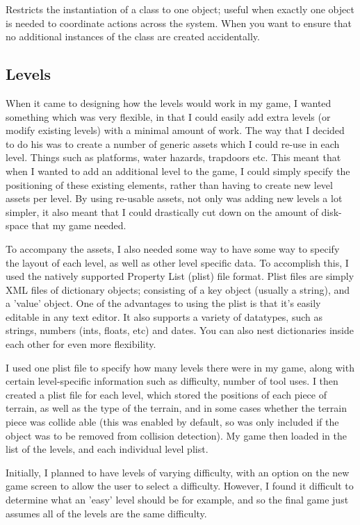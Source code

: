\documentclass[a4paper,oneside]{report}
\begin{document}
Restricts the instantiation of a class to one object; useful when exactly one object is needed to coordinate actions across the system. When you want to ensure that no additional instances of the class are created accidentally.

\subsection{Levels} When it came to designing how the levels would work in my game, I wanted something which was very flexible, in that I could easily add extra levels (or modify existing levels) with a minimal amount of work. The way that I decided to do his was to create a number of generic assets which I could re-use in each level. Things such as platforms, water hazards, trapdoors etc. This meant that when I wanted to add an additional level to the game, I could simply specify the positioning of these existing elements, rather than having to create new level assets per level. By using re-usable assets, not only was adding new levels a lot simpler, it also meant that I could drastically cut down on the amount of disk-space that my game needed.

To accompany the assets, I also needed some way to have some way to specify the layout of each level, as well as other level specific data. To accomplish this, I used the natively supported Property List (plist) file format. Plist files are simply XML files of dictionary objects; consisting of a key object (usually a string), and a 'value' object. One of the advantages to using the plist is that it's easily editable in any text editor. It also supports a variety of datatypes, such as strings, numbers (ints, floats, etc) and dates. You can also nest dictionaries inside each other for even more flexibility. 

I used one plist file to specify how many levels there were in my game, along with certain level-specific information such as difficulty, number of tool uses. I then created a plist file for each level, which stored the positions of each piece of terrain, as well as the type of the terrain, and in some cases whether the terrain piece was collide able (this was enabled by default, so was only included if the object was to be removed from collision detection). My game then loaded in the list of the levels, and each individual level plist. 

Initially, I planned to have levels of varying difficulty, with an option on the new game screen to allow the user to select a difficulty. However, I found it difficult to determine what an 'easy' level should be for example, and so the final game just assumes all of the levels are the same difficulty.
\end{document}
